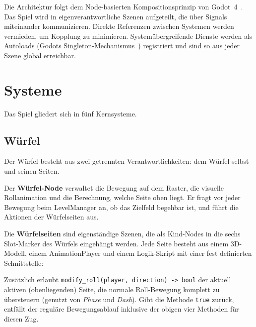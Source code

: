 \documentclass[oneside]{ausarbeitung}
\begin{document}
Die Architektur folgt dem Node-basierten Kompositionsprinzip von Godot~4~\cite{godot:engine}. Das Spiel wird in eigenverantwortliche Szenen aufgeteilt, die über Signals~\cite{godot:signals} miteinander kommunizieren. Direkte Referenzen zwischen Systemen werden vermieden, um Kopplung zu minimieren. Systemübergreifende Dienste werden als Autoloads (Godots Singleton-Mechanismus~\cite{godot:autoload}) registriert und sind so aus jeder Szene global erreichbar.
 
\section{Systeme}
 
Das Spiel gliedert sich in fünf Kernsysteme.
 
\subsection{Würfel}
 
Der Würfel besteht aus zwei getrennten Verantwortlichkeiten: dem Würfel selbst und seinen Seiten.
 
Der \textbf{Würfel-Node} verwaltet die Bewegung auf dem Raster, die visuelle Rollanimation und die Berechnung, welche Seite oben liegt. Er fragt vor jeder Bewegung beim LevelManager an, ob das Zielfeld begehbar ist, und führt die Aktionen der Würfelseiten aus.
 
Die \textbf{Würfelseiten} sind eigenständige Szenen, die als Kind-Nodes in die sechs Slot-Marker des Würfels eingehängt werden. Jede Seite besteht aus einem 3D-Modell, einem AnimationPlayer und einem Logik-Skript mit einer fest definierten Schnittstelle:
 
\begin{infoblock}
\end{infoblock}

Zusätzlich erlaubt \texttt{modify\_roll(player, direction) -> bool} der aktuell aktiven (obenliegenden) Seite, die normale Roll-Bewegung komplett zu übersteuern (genutzt von \textit{Phase} und \textit{Dash}). Gibt die Methode \texttt{true} zurück, entfällt der reguläre Bewegungsablauf inklusive der obigen vier Methoden für diesen Zug.
 
\end{document}
